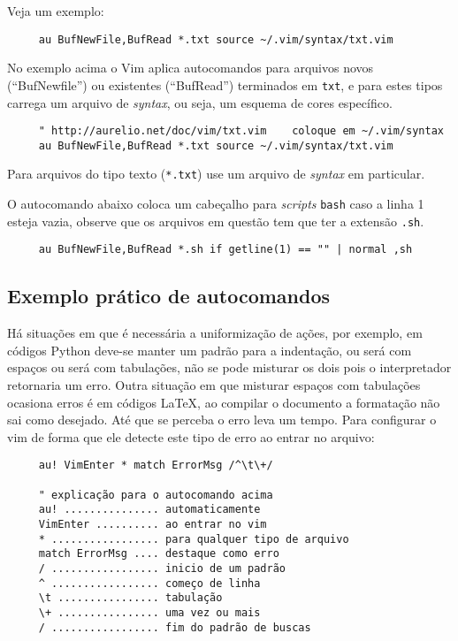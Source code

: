 Veja um exemplo:

\begin{verbatim}
     au BufNewFile,BufRead *.txt source ~/.vim/syntax/txt.vim
\end{verbatim}

No exemplo acima o Vim aplica autocomandos para arquivos novos
(``BufNewfile'') ou existentes (``BufRead'') terminados em \verb|txt|, e para
estes tipos carrega um arquivo de {\em syntax}, ou seja, um esquema de cores
específico.

\begin{verbatim}
     " http://aurelio.net/doc/vim/txt.vim    coloque em ~/.vim/syntax
     au BufNewFile,BufRead *.txt source ~/.vim/syntax/txt.vim
\end{verbatim}

Para arquivos do tipo texto (\verb|*.txt|) use um arquivo de {\em syntax} em
particular.

O autocomando abaixo coloca um cabeçalho para {\em scripts} {\tt bash} caso a
linha 1 esteja vazia, observe que os arquivos em questão tem que ter a
extensão \verb|.sh|.

\begin{verbatim}
     au BufNewFile,BufRead *.sh if getline(1) == "" | normal ,sh
\end{verbatim}

\subsection{Exemplo prático de autocomandos}
\label{sub:Exemplo prático de autocomandos}

Há situações em que é necessária a uniformização de ações, por exemplo, em
códigos Python deve-se manter um padrão para a indentação, ou será com espaços
ou será com tabulações, não se pode misturar os dois pois o interpretador retornaria um erro.
Outra situação em que misturar espaços com tabulações ocasiona erros é em
códigos \LaTeX, ao compilar o documento a formatação não sai como desejado.
Até que se perceba o erro leva um tempo.  Para configurar o vim de forma que
ele detecte este tipo de erro ao entrar no arquivo:

\begin{verbatim}
     au! VimEnter * match ErrorMsg /^\t\+/

     " explicação para o autocomando acima
     au! ............... automaticamente
     VimEnter .......... ao entrar no vim
     * ................. para qualquer tipo de arquivo
     match ErrorMsg .... destaque como erro
     / ................. inicio de um padrão
     ^ ................. começo de linha
     \t ................ tabulação
     \+ ................ uma vez ou mais
     / ................. fim do padrão de buscas
\end{verbatim}

